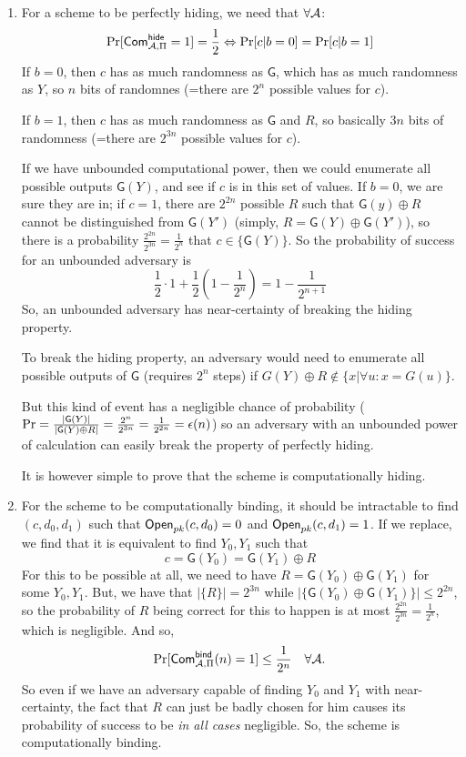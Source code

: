 \begin{solution}
	\begin{enumerate}
		\item For a scheme to be perfectly hiding, we need that $\forall \mathcal{A}$:
		\[ \Pr[\mathsf{Com}^\mathsf{hide}_{\mathcal{A},\Pi}=1]=\frac12 \Leftrightarrow \Pr[c|b=0] = \Pr[c|b=1] \]
		If $b=0$, then $c$ has as much randomness as $\mathsf{G}$, which has as much randomness as $Y$, so $n$ bits of randomnes (=there are $2^n$ possible values for $c$).

		If $b=1$, then $c$ has as much randomness as $\mathsf{G}$ and $R$, so basically $3n$ bits of randomness (=there are $2^{3n}$ possible values for $c$).

		If we have unbounded computational power, then we could enumerate all possible outputs $\mathsf{G}(Y)$, and see if $c$ is in this set of values.
		If $b=0$, we are sure they are in;
		if $c=1$, there are $2^{2n}$ possible $R$ such that $\mathsf{G}(y) \oplus R$ cannot be distinguished from $\mathsf{G}(Y')$ (simply, $R=\mathsf{G}(Y)\oplus \mathsf{G}(Y')$), so there is a probability $\frac{2^{2n}}{2^{3n}}=\frac{1}{2^{n}}$ that $c \in \{\mathsf{G}(Y)\}$.
		So the probability of success for an unbounded adversary is
		\[ \frac{1}{2} \cdot 1 + \frac{1}{2} (1-\frac{1}{2^{n}}) = 1-\frac{1}{2^{n+1}} \]
		So, an unbounded adversary has near-certainty of breaking the hiding property.

		To break the hiding property, an adversary would need to enumerate all possible outputs of $\mathsf{G}$ (requires $2^n$ steps) if $G(Y) \oplus R \notin \{x | \forall u : x = G(u)\}$.

		But this kind of event has a negligible chance of probability ($\Pr = \frac{|\mathsf{G}(Y)|}{|\mathsf{G}(Y) \oplus R|} = \frac{2^n}{2^{3n}} = \frac{1}{2^{2n}} = \epsilon(n)$) so an adversary with an unbounded power of calculation can easily break the property of perfectly hiding.

		It is however simple to prove that the scheme is computationally hiding.

		\item For the scheme to be computationally binding, it should be intractable to find $(c, d_0, d_1)$ such that $\operatorname{\mathsf{Open}}_{pk}(c, d_0)=0$ and $\operatorname{\mathsf{Open}}_{pk}(c, d_1)=1$.
		If we replace, we find that it is equivalent to find $Y_0, Y_1$ such that
		\[ c=\mathsf{G}(Y_0) = \mathsf{G}(Y_1) \oplus R \]
		For this to be possible at all, we need to have $R=\mathsf{G}(Y_0) \oplus \mathsf{G}(Y_1)$ for some $Y_0, Y_1$.
		But, we have that $|\{R\}|=2^{3n}$ while $|\{ \mathsf{G}(Y_0) \oplus \mathsf{G}(Y_1) \}| \le 2^{2n}$, so the probability of $R$ being correct for this to happen is at most $\frac{2^{2n}}{2^{3n}}=\frac{1}{2^n}$, which is negligible.
		And so, \[ \Pr[\mathsf{Com}^\mathsf{bind}_{\mathcal{A}, \Pi}(n)=1] \le \frac{1}{2^n} \quad \forall \mathcal{A}. \]
		So even if we have an adversary capable of finding $Y_0$ and $Y_1$ with near-certainty, the fact that $R$ can just be badly chosen for him causes its probability of success to be \emph{in all cases} negligible.
		So, the scheme is computationally binding.


\end{enumerate}
\end{solution}
